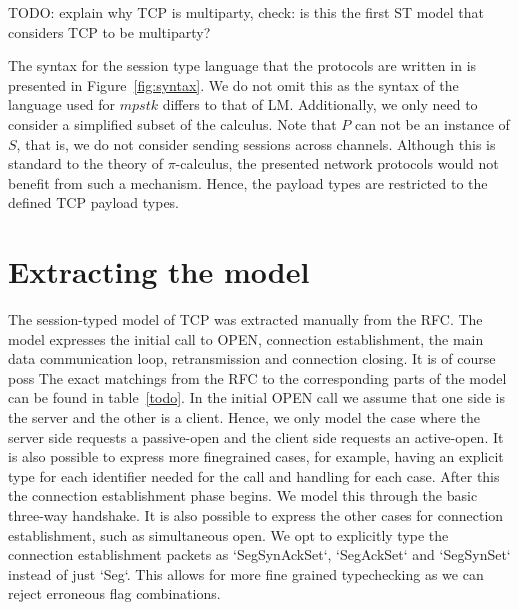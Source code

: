 \documentclass{article}
\newcommand{\todo}[1]{}
\renewcommand{\todo}[1]{{\color{red} TODO: {#1}}}
\begin{document}
\todo{explain why TCP is multiparty, check: is this the first ST model that considers TCP to be multiparty?}

The syntax for the session type language that the protocols are written in is presented in Figure~\ref{fig:syntax}.
We do not omit this as the syntax of the language used for \ensuremath{mpstk} differs to that of LM.
Additionally, we only need to consider a simplified subset of the calculus.
Note that \ensuremath{P} can not be an instance of \ensuremath{S}, that is, we do not consider sending sessions across channels.
Although this is standard to the theory of \ensuremath{\pi}-calculus, the presented network protocols would not benefit from such a mechanism.
Hence, the payload types are restricted to the defined TCP payload types.

\section{Extracting the model}

The session-typed model of TCP was extracted manually from the RFC.
The model expresses the initial call to OPEN, connection establishment, the main data communication loop, retransmission and connection closing.
It is of course poss
The exact matchings from the RFC to the corresponding parts of the model can be found in table~\ref{todo}.
In the initial OPEN call we assume that one side is the server and the other is a client.
Hence, we only model the case where the server side requests a passive-open and the client side requests an active-open.
It is also possible to express more finegrained cases, for example, having an explicit type for each identifier needed for the call and handling for each case.
After this the connection establishment phase begins.
We model this through the basic three-way handshake.
It is also possible to express the other cases for connection establishment, such as simultaneous open.
We opt to explicitly type the connection establishment packets as `SegSynAckSet`, `SegAckSet` and `SegSynSet` instead of just `Seg`.
This allows for more fine grained typechecking as we can reject erroneous flag combinations.

\medskip
\nocite{*}
\printbibliography
\end{document}
